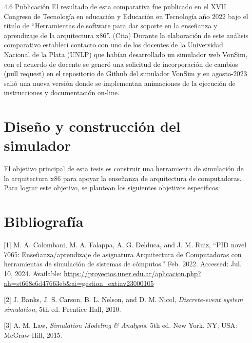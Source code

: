 \documentclass[12pt,twoside]{templates/unerthesis}
\begin{document}
4.6 Publicación
El resultado de esta comparativa fue publicado en el XVII Congreso de Tecnología en educación y Educación en Tecnología año 2022 bajo el título de ``Herramientas de software para dar soporte en la enseñanza y aprendizaje de la arquitectura x86''. (Cita)
Durante la elaboración de este análisis comparativo establecí contacto con uno de los docentes de la Universidad Nacional de la Plata (UNLP) que habían desarrollado un simulador web VonSim, con el acuerdo de docente se generó una solicitud de incorporación de cambios (pull request) en el repositorio de Github del simulador VonSim y en agosto-2023 salió una nueva versión donde se implementan animaciones de la ejecución de instrucciones y documentación on-line.

\hypertarget{diseuxf1o-y-construcciuxf3n-del-simulador}{%
\chapter{Diseño y construcción del simulador}\label{diseuxf1o-y-construcciuxf3n-del-simulador}}

El objetivo principal de esta tesis es construir una herramienta de simulación de la arquitectura x86 para apoyar la enseñanza de arquitectura de computadoras. Para lograr este objetivo, se plantean los siguientes objetivos específicos:

\hypertarget{bibliografuxeda}{%
\chapter*{Bibliografía}\label{bibliografuxeda}}

\hypertarget{refs}{}
\leavevmode\hypertarget{ref-colombani_pid_2022}{}%
{[}1{]} M. A. Colombani, M. A. Falappa, A. G. Delduca, and J. M. Ruiz, ``PID novel 7065: Enseñanza/aprendizaje de asignatura Arquitectura de Computadoras con herramientas de simulación de sistemas de cómputos.'' Feb. 2022. Accessed: Jul. 10, 2024. Available: \href{https://proyectos.uner.edu.ar/aplicacion.php?ah=st668e6d47663eb\&ai=gestion_extinv\%7C\%7C23000105}{https://proyectos.uner.edu.ar/aplicacion.php?ah=st668e6d47663eb\&ai=gestion\_extinv\textbar{}\textbar{}23000105}

\leavevmode\hypertarget{ref-banks_discrete-event_2010}{}%
{[}2{]} J. Banks, J. S. Carson, B. L. Nelson, and D. M. Nicol, \emph{Discrete-event system simulation}, 5th ed. Prentice Hall, 2010.

\leavevmode\hypertarget{ref-law_simulation_2015}{}%
{[}3{]} A. M. Law, \emph{Simulation Modeling \& Analysis}, 5th ed. New York, NY, USA: McGraw-Hill, 2015.
\end{document}
